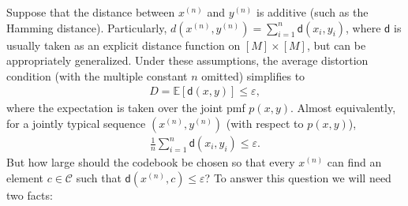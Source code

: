 \documentclass[10pt,a4paper]{amsart}
\numberwithin{equation}{section}
\theoremstyle{plain}
\theoremstyle{definition}
\def\E{{\mathbb E}}
\def\e{{\varepsilon}}
\begin{document}
Suppose that the distance between $x^{(n)}$ and $y^{(n)}$ is additive (such as the Hamming distance). Particularly, $d(x^{(n)}, y^{(n)})=\sum_{i=1}^n \mathsf{d}(x_i, y_i)$, where $\mathsf d$ is usually taken as an explicit distance function on $[M]\times [M]$, but can be appropriately generalized. Under these assumptions, the average distortion condition (with the multiple constant $n$ omitted) simplifies to 
\begin{align*}
D = \E[\mathsf d(x, y)]\leq \e,
\end{align*}
where the expectation is taken over the joint pmf $p(x, y)$. 
Almost equivalently, for a jointly typical sequence $(x^{(n)}, y^{(n)})$ (with respect to $p(x, y)$), 
\begin{align*} 
\frac{1}{n}\sum_{i=1}^n\mathsf d(x_i, y_i)\leq \e.
\end{align*}
But how large should the codebook be chosen so that every $x^{(n)}$ can find an element $c\in\mathcal C$ such that $\mathsf d(x^{(n)}, c)\leq \e$? 
To answer this question we will need two facts:
\end{document}
